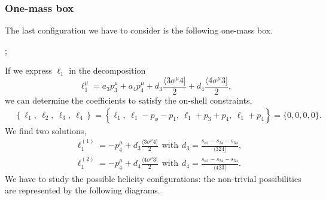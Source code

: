 \subsubsection{One-mass box}
The last configuration we have to consider is the following one-mass box.
\begin{center}
;
\end{center}
If we express $\ell_1$ in the decomposition
$$
	\ell_1^\mu=a_3 p_3^\mu +a_4 p_4^\mu +d_3\frac{\langle 3 \sigma^\mu 4]}{2}+d_4 \frac{\langle 4 \sigma^\mu 3]}{2},
$$
we can determine the coefficients to satisfy the on-shell constraints,
\begin{align*}
	&\left\{\ell_1,\ \ell_2,\ \ell_3,\ \ell_4\right\}=\left\{\ell_1,\ \ell_1-p_\phi-p_1,\ \ell_1+p_3+p_4,\ \ell_1+p_4\right\}=\{0,0,0,0\}.
\end{align*}
We find two solutions,
\begin{align}
	&\ell_1^{(1)}=-p_4^\mu +d_3\frac{\langle3\sigma^\mu4]}{2} \ \ \text{with} \ \ d_3=\frac{s_{\phi1}-s_{24}-s_{34}}{\langle 324]}, \\
	&\ell_1^{(2)}=-p_4^\mu +d_4\frac{\langle4\sigma^\mu3]}{2} \ \ \text{with} \ \ d_4=\frac{s_{\phi1}-s_{24}-s_{34}}{\langle423]}.
\end{align}
We have to study the possible helicity configurations: the non-trivial possibilities are represented by the following diagrams.
